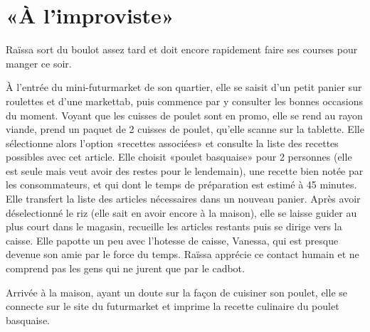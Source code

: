 \section{«À l'improviste»}

Raïssa sort du boulot assez tard et doit encore rapidement faire ses courses pour manger ce soir.
\par
À l'entrée du mini-futurmarket de son quartier, elle se saisit d'un petit panier sur roulettes et d'une markettab, puis commence par y consulter les bonnes occasions du moment.
Voyant que les cuisses de poulet sont en promo, elle se rend au rayon viande, prend un paquet de 2 cuisses de poulet, qu'elle scanne sur la tablette.
Elle sélectionne alors l'option «recettes associées» et consulte la liste des recettes possibles avec cet article.
Elle choisit «poulet basquaise» pour 2 personnes (elle est seule mais veut avoir des restes pour le lendemain), une recette bien notée par les consommateurs, et qui dont le temps de préparation est estimé à 45 minutes.
Elle transfert la liste des articles nécessaires dans un nouveau panier.
Après avoir déselectionné le riz (elle sait en avoir encore à la maison), elle se laisse guider au plus court dans le magasin, recueille les articles restants puis se dirige vers la caisse.
Elle papotte un peu avec l'hotesse de caisse, Vanessa, qui est presque devenue son amie par le force du temps. 
Raïssa apprécie ce contact humain et ne comprend pas les gens qui ne jurent que par le cadbot.
\par
Arrivée à la maison, ayant un doute sur la façon de cuisiner son poulet, elle se connecte sur le site du futurmarket et imprime la recette culinaire du poulet basquaise.
